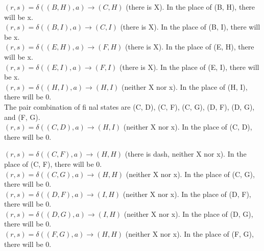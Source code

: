 \documentclass[8pt]{beamer}
\begin{document}
\begin{frame}
\hspace*{0.4cm} $(r, s) = \delta((B, H), a) \rightarrow (C, H)$ (there is X). In the place of (B, H), there will be x.\\
\hspace*{0.4cm} $(r, s) = \delta((B, I), a) \rightarrow (C, I)$ (there is X). In the place of (B, I), there will be x.\\
\hspace*{0.4cm} $(r, s) = \delta((E, H), a) \rightarrow (F, H)$ (there is X). In the place of (E, H), there will be x.\\
\hspace*{0.4cm} $(r, s) = \delta((E, I), a) \rightarrow (F, I)$ (there is X). In the place of (E, I), there will be x.\\
\hspace*{0.4cm} $(r, s) = \delta((H, I), a) \rightarrow (H, I)$ (neither X nor x). In the place of (H, I), there will be 0.\\

\vspace*{0.1cm}
 The pair combination of fi nal states are (C, D), (C, F), (C, G), (D, F), (D, G), and (F, G).\\

\vspace*{0.1cm}
\hspace*{0.4cm} $(r, s) = \delta((C, D), a) \rightarrow (H, I)$ (neither X nor x). In the place of (C, D), there will be 0.\\

\end{frame}

\begin{frame}
\hspace*{0.4cm} $(r, s) = \delta((C, F), a) \rightarrow (H, H)$ (there is dash, neither X nor x). In the place of (C, F), there will be 0.\\
\hspace*{0.4cm} $(r, s) = \delta((C, G), a) \rightarrow (H, H)$ (neither X nor x). In the place of (C, G), there will be 0.\\
\hspace*{0.4cm} $(r, s) = \delta((D, F), a) \rightarrow (I, H)$ (neither X nor x). In the place of (D, F), there will be 0.\\
\hspace*{0.4cm} $(r, s) = \delta((D, G), a) \rightarrow (I, H)$ (neither X nor x). In the place of (D, G), there will be 0.\\
\hspace*{0.4cm} $(r, s) = \delta((F, G), a) \rightarrow (H, H)$ (neither X nor x). In the place of (F, G), there will be 0.\\

\end{frame}
\end{document}
